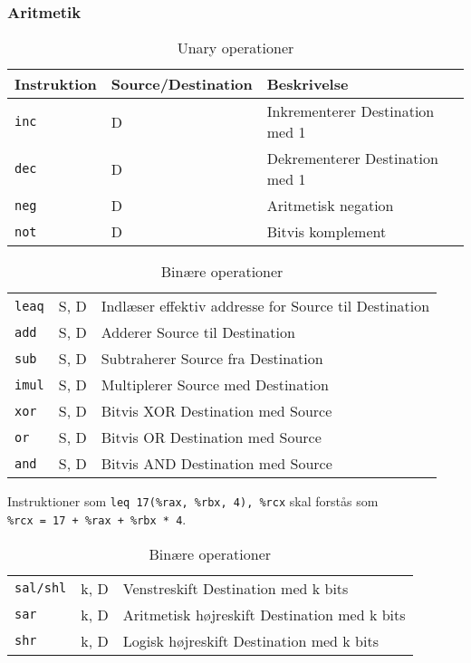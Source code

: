 \subsubsection{Aritmetik}
\begin{table}[h!]
    \centering
    \begin{tabular}{ll|l}
        Instruktion&Source/Destination&Beskrivelse\\\hline
        \verb|inc|&D&Inkrementerer Destination med 1\\
        \verb|dec|&D&Dekrementerer Destination med 1\\
        \verb|neg|&D&Aritmetisk negation\\
        \verb|not|&D&Bitvis komplement
    \end{tabular}
    \caption{Unary operationer}
\end{table}
\begin{table}[h!]
    \centering
    \begin{tabular}{ll|l}
        \verb|leaq|&S, D&Indlæser effektiv addresse for Source til Destination\\
        \verb|add|&S, D&Adderer Source til Destination\\
        \verb|sub|&S, D&Subtraherer Source fra Destination\\
        \verb|imul|&S, D&Multiplerer Source med Destination\\
        \verb|xor|&S, D&Bitvis XOR Destination med Source\\
        \verb|or|&S, D&Bitvis OR Destination med Source\\
        \verb|and|&S, D&Bitvis AND Destination med Source
    \end{tabular}
    \caption{Binære operationer}
\end{table}
Instruktioner som \verb|leq 17(%rax, %rbx, 4), %rcx| skal forstås som \\\verb|%rcx = 17 + %rax + %rbx * 4|.
\begin{table}[h!]
    \centering
    \begin{tabular}{ll|l}
        \verb|sal/shl|&k, D&Venstreskift Destination med k bits\\
        \verb|sar|&k, D&Aritmetisk højreskift Destination med k bits\\
        \verb|shr|&k, D&Logisk højreskift Destination med k bits
    \end{tabular}
    \caption{Binære operationer}
\end{table}
